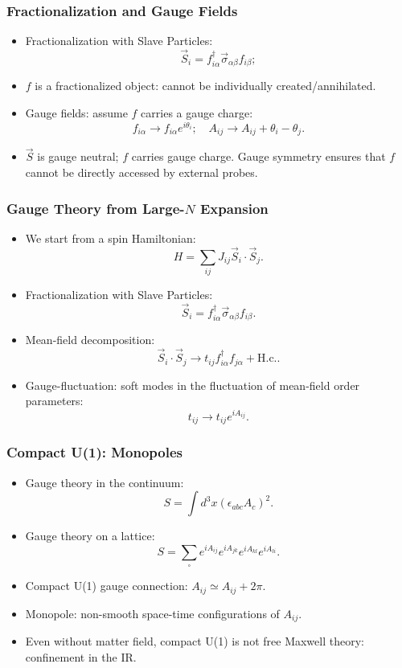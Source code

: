 \documentclass[xcolor=table, 10pt, aspectratio=43]{beamer}
\begin{document}
\begin{frame}
  \frametitle{Fractionalization and Gauge Fields}
  \begin{itemize}
    \item Fractionalization with Slave Particles:
    \[\vec S_i = f_{i\alpha}^\dagger\vec\sigma_{\alpha\beta}f_{i\beta};\]
    \item $f$ is a fractionalized object: cannot be individually created/annihilated.
    \item Gauge fields: assume $f$ carries a gauge charge:
    \[f_{i\alpha}\rightarrow f_{i\alpha}e^{i\theta_i};
    \quad
    A_{ij}\rightarrow A_{ij}+\theta_i-\theta_j.\]
    \item $\vec S$ is gauge neutral; $f$ carries gauge charge. Gauge symmetry ensures that $f$ cannot be directly accessed by external probes.
  \end{itemize}
\end{frame}

\begin{frame}
  \frametitle{Gauge Theory from Large-$N$ Expansion}
  \begin{itemize}
    \item We start from a spin Hamiltonian:
    \[H = \sum_{ij} J_{ij}\vec S_i\cdot\vec S_j.\]
    \item Fractionalization with Slave Particles:
    \[\vec S_i = f_{i\alpha}^\dagger\vec\sigma_{\alpha\beta}f_{i\beta}.\]
    \item Mean-field decomposition:
    \[\vec S_i\cdot\vec S_j\rightarrow t_{ij}f_{i\alpha}^\dagger f_{j\alpha}+\text{H.c.}.\]
    \item Gauge-fluctuation: soft modes in the fluctuation of mean-field order parameters:
    \[t_{ij}\rightarrow t_{ij}e^{iA_{ij}}.\]
  \end{itemize}
\end{frame}

\begin{frame}
  \frametitle{Compact U(1): Monopoles}
  \begin{itemize}
    \item Gauge theory in the continuum:
    \[S=\int d^3x (\epsilon_{abc}A_c)^2.\]
    \item Gauge theory on a lattice:
    \[S=\sum_{\square}e^{iA_{ij}}e^{iA_{jk}}e^{iA_{kl}}e^{iA_{li}}.\]
    \item Compact U(1) gauge connection: $A_{ij}\simeq A_{ij}+2\pi$.
    \item Monopole: non-smooth space-time configurations of $A_{ij}$.
    \item Even without matter field, compact U(1) is not free Maxwell theory: confinement in the IR.
  \end{itemize}
\end{frame}
\end{document}
